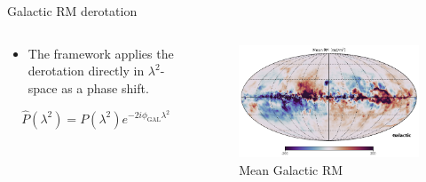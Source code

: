 \documentclass[xetex,aspectratio=169]{beamer}
\begin{document}
    \begin{frame}{Galactic RM derotation}
        \begin{columns}[onlytextwidth,t]
            \begin{column}{.5\textwidth}
            \begin{itemize}
                \item The framework applies the derotation directly in $\lambda^2$-space as a phase shift.
            \end{itemize}
            \vspace{1cm}
                \begin{equation*}
                    \hat{P}(\lambda^2) = P(\lambda^2)e^{-2i\phi_{\text{GAL}}\lambda^2}
                \end{equation*}
            \end{column}
            
            \begin{column}{.5\textwidth}
                \begin{figure}
                    \centering
                    \includegraphics[width=\textwidth]{figures/galactic_derotation/image (2).png}
                    \caption*{Mean Galactic RM \parencite{faradaysky2020}}
                \end{figure}
            \end{column}
        \end{columns}
    \end{frame}
    
\end{document}
